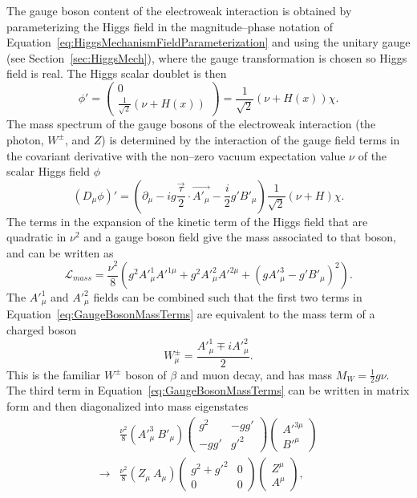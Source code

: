 The gauge boson content of the electroweak interaction is obtained by
parameterizing the Higgs field in the magnitude--phase notation of
Equation~\ref{eq:HiggsMechanismFieldParameterization} and using the unitary
gauge (see Section~\ref{sec:HiggsMech}), where the gauge transformation is
chosen so Higgs field is real.  The Higgs scalar doublet is then 
\begin{equation}
  \phi' =  \left(\begin{array}{c} 0 \\ \frac{1}{\sqrt 2}(\nu +
    H(x))\end{array}\right) = 
    \frac{1}{\sqrt 2}(\nu + H(x))\chi.
    \label{eq:HiggsFieldParameterization}
\end{equation}
The mass spectrum of the gauge bosons of the electroweak interaction (the
photon, $W^\pm$, and $Z$) is determined by the interaction of the gauge field
terms in the covariant derivative with the non--zero vacuum expectation value
$\nu$ of the scalar Higgs field $\phi$
\begin{equation}
  (D_\mu\phi)' = (\partial_\mu - i g \frac{\vec \tau}{2}\cdot \vec{A'_\mu} -
  \frac{i}{2}g'B'_\mu)\frac{1}{\sqrt 2}(\nu + H)\chi.
  \nonumber
\end{equation}
The terms in the expansion of the kinetic term of the Higgs field that are
quadratic in $\nu^2$ and a gauge boson field give the mass associated to that
boson, and can be written as
\begin{equation}
  \mathcal{L}_{mass} = \frac{\nu^2}{8}(
  g^2 A'^1_\mu A'^{1\mu} + g^2 A'^2_\mu A'^{2\mu} + (g A'^3_\mu - g'B'_\mu)^2).
  \label{eq:GaugeBosonMassTerms}
\end{equation}
The $A'^1_\mu$ and $A'^2_\mu$ fields can be combined such that the first two
terms in Equation~\ref{eq:GaugeBosonMassTerms} are equivalent to the mass term
of a charged boson
\begin{equation}
  W^\pm_\mu = \frac{A'^{1}_\mu \mp iA'^2_\mu}{2}.
\end{equation}
This is the familiar $W^\pm$ boson of $\beta$ and muon decay, and has mass $M_W
= \frac{1}{2}g\nu$.  The third term in Equation~\ref{eq:GaugeBosonMassTerms} can
be written in matrix form and then diagonalized into mass eigenstates
\begin{eqnarray}
  &\frac{\nu^2}{8}(A'^3_\mu~B'_\mu) 
  \left(
  \begin{array}{cc}
    g^2 & -gg' \\
    -gg' & g'^2 
  \end{array}
  \right)
  \left(
  \begin{array}{c}
    A'^{3\mu} \\
    B'^\mu
  \end{array}
  \right) \\
  \to & 
  \frac{\nu^2}{8}(Z_\mu~A_\mu) 
  \left(
  \begin{array}{cc}
    g^2 + g'^2  & 0\\
    0 & 0 
  \end{array}
  \right)
  \left(
  \begin{array}{c}
    Z^\mu \\
    A^\mu
  \end{array}
  \right), \nonumber 
\end{eqnarray}
